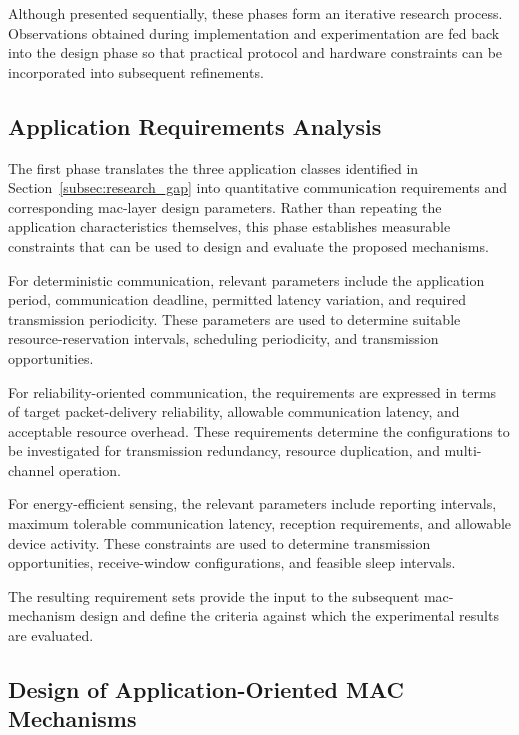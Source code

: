 \documentclass[12pt,a4paper]{article}
\begin{document}
Although presented sequentially, these phases form an iterative research
process. Observations obtained during implementation and experimentation are
fed back into the design phase so that practical protocol and hardware
constraints can be incorporated into subsequent refinements.


\subsection{Application Requirements Analysis}
\label{subsec:requirements_analysis}

The first phase translates the three application classes identified in
Section~\ref{subsec:research_gap} into quantitative communication requirements
and corresponding \gls{mac}-layer design parameters. Rather than repeating the
application characteristics themselves, this phase establishes measurable
constraints that can be used to design and evaluate the proposed mechanisms.

For deterministic communication, relevant parameters include the application
period, communication deadline, permitted latency variation, and required
transmission periodicity. These parameters are used to determine suitable
resource-reservation intervals, scheduling periodicity, and transmission
opportunities.

For reliability-oriented communication, the requirements are expressed in
terms of target packet-delivery reliability, allowable communication latency,
and acceptable resource overhead. These requirements determine the
configurations to be investigated for transmission redundancy, resource
duplication, and multi-channel operation.

For energy-efficient sensing, the relevant parameters include reporting
intervals, maximum tolerable communication latency, reception requirements,
and allowable device activity. These constraints are used to determine
transmission opportunities, receive-window configurations, and feasible sleep
intervals.

The resulting requirement sets provide the input to the subsequent
\gls{mac}-mechanism design and define the criteria against which the
experimental results are evaluated.


\subsection{Design of Application-Oriented MAC Mechanisms}
\label{subsec:mac_design}
\end{document}
